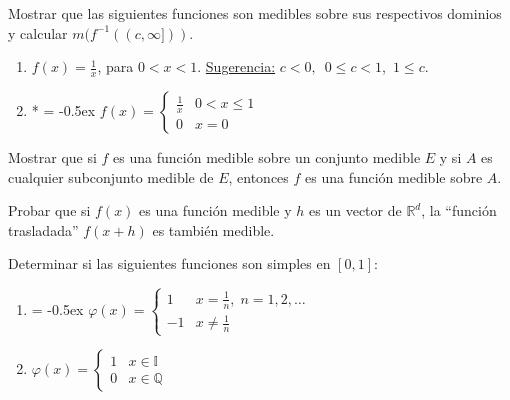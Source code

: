 \documentclass{book}
\newcommand{\rr}{\mathbb{R}}
\newcommand{\qq}{\mathbb{Q}}
\newcommand{\ii}{\mathbb{I}}
\begin{document}
\begin{ejer}{} 
Mostrar que las siguientes funciones son medibles sobre sus respectivos dominios y calcular 
$m(f^{-1}((c,\infty]))$.
\begin{enumerate}
\item  $f(x)=\frac{1}{x}$, para $0<x<1$. \;\;
\underline{Sugerencia:} $c<0,$\, $0\leq c<1$,\, $1\leq c$.
\item* 
{
\extrarowheight = -0.5ex
\renewcommand{\arraystretch}{1.8}
$f(x)=\left\{
\begin{array}{ll}
\frac{1}{x}&0<x\leq 1
\\
0&x=0
\end{array}
\right.$}
\end{enumerate}
\end{ejer}


\begin{ejer}{} 
Mostrar que si $f$ es una funci\'on  medible sobre un conjunto medible $E$ y si $A$ es cualquier subconjunto medible de $E$, entonces $f$ es una funci\'on medible sobre $A$.
\end{ejer}




\begin{ejer}{} 
Probar que si $f(x)$ es una función medible y $h$ es un vector de $\rr^d$, la ``función 
trasladada'' $f(x+h)$ es también medible.
\end{ejer}



\begin{ejer}{} 
Determinar si las siguientes funciones son simples en $[0,1]$:
\begin{enumerate}
\item 
{
\extrarowheight = -0.5ex
\renewcommand{\arraystretch}{1.8}
$\varphi(x)=
\left\{
\begin{array}{rl}
1& x=\frac{1}{n},\;n=1,2,\dots
\\
-1&x\neq \frac{1}{n}
\end{array}
\right.
$}
\item 
$\varphi(x)=
\left\{
\begin{array}{ll}
1& x \in \ii
\\
0&x\in \qq
\end{array}
\right.
$
\end{enumerate}
\end{ejer}
\end{document}

